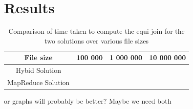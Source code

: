 \documentclass[10pt,twocolumn]{witseiepaper}
\begin{document}
%
%

\section{Results}

\begin{table} [h]
	\centering
	\caption{Comparison of time taken to compute the equi-join for the two solutions over various file sizes}
	\label{tab:results}

\begin{tabular}{|c|c|c|c|}
	\hline 
	File size & 100 000 & 1 000 000 & 10 000 000 \\ 
	\hline
	\hline 
	Hybid Solution &  &  &  \\ 
	\hline 
	MapReduce Solution &  &  &  \\ 
	\hline 
\end{tabular} 
\end{table}

or graphs will probably be better? Maybe we need both
\end{document}
